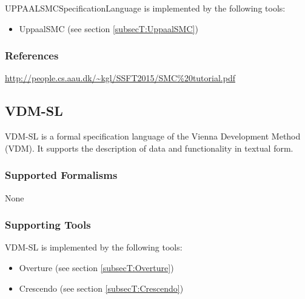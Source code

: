 UPPAALSMCSpecificationLanguage is implemented by the following tools:
\begin{itemize}
	\item UppaalSMC (see section \ref{subsecT:UppaalSMC})
\end{itemize}


\subsubsection{References}

\url{http://people.cs.aau.dk/~kgl/SSFT2015/SMC\%20tutorial.pdf}




\subsection{VDM-SL}
\label{subsecL:VDM-SL}

VDM-SL is a formal specification language of the Vienna Development Method (VDM). 
It supports the description of data and functionality in textual form.

\subsubsection{Supported Formalisms}

None


\subsubsection{Supporting Tools}

VDM-SL is implemented by the following tools:
\begin{itemize}
	\item Overture (see section \ref{subsecT:Overture})
	\item Crescendo (see section \ref{subsecT:Crescendo})
\end{itemize}


